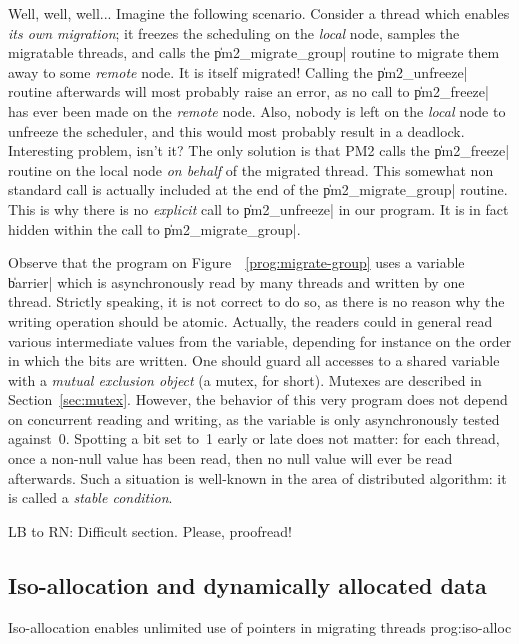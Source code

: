 Well, well, well... Imagine the following scenario. Consider a thread
which enables \emph{its own migration}; it freezes the scheduling on the
\emph{local} node, samples the migratable threads, and calls the
\|pm2_migrate_group| routine to migrate them away to some
\emph{remote} node. It is itself migrated! Calling the \|pm2_unfreeze|
routine afterwards will most probably raise an error, as no call to
\|pm2_freeze| has ever been made on the \emph{remote} node. Also,
nobody is left on the \emph{local} node to unfreeze the scheduler, and
this would most probably result in a deadlock.  Interesting problem,
isn't it? The only solution is that PM2 calls the \|pm2_freeze|
routine on the local node \emph{on behalf} of the migrated thread.
This somewhat non standard call is actually included at the end of the
\|pm2_migrate_group| routine.  This is why there is no \emph{explicit}
call to \|pm2_unfreeze| in our program.  It is in
fact hidden within the call to \|pm2_migrate_group|.

Observe that the program on Figure~~\ref{prog:migrate-group} uses a
variable \|barrier| which is asynchronously read by many threads and
written by one thread. Strictly speaking, it is not correct to do so,
as there is no reason why the writing operation should be atomic.
Actually, the readers could in general read various intermediate
values from the variable, depending for instance on the order in which
the bits are written. One should guard all accesses to a shared
variable with a \emph{mutual exclusion object} (a mutex, for short).
Mutexes are described in Section~\ref{sec:mutex}.  However, the
behavior of this very program does not depend on concurrent reading
and writing, as the variable is only asynchronously tested against~0.
Spotting a bit set to~1 early or late does not matter: for each thread,
once a non-null value has been read, then no null value will ever be
read afterwards. Such a situation is well-known in the area of
distributed algorithm: it is called a \emph{stable condition}. 

\begin{note}
  LB to RN: Difficult section. Please, proofread!
\end{note}


\subsection{Iso-allocation and dynamically allocated data}

 {Iso-allocation enables unlimited use of
  pointers in migrating threads} {prog:iso-alloc}

